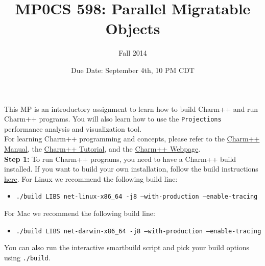 \documentclass{article}
\title{MP0}
\title{CS 598: Parallel Migratable Objects}
\author{Fall 2014}
\date{Due Date: September 4th, 10 PM CDT}
\begin{document}
\maketitle

This MP is an introductory assignment to learn how to build Charm++ and run
Charm++ programs. You will also learn how to use the \texttt{Projections}
performance analysis and visualization tool. \\

For learning Charm++ programming and concepts, please refer to the
\href{http://charm.cs.illinois.edu/manuals/html/charm++/}{Charm++ Manual},
the \href{http://charm.cs.illinois.edu/tutorial/}{Charm++ Tutorial},
and the \href{http://charmplusplus.org/}{Charm++ Webpage}.\\

\textbf{Step 1:} To run Charm++ programs, you need to have a Charm++ build
installed. If you want to build your own installation, follow the build
instructions \href{http://charm.cs.illinois.edu/manuals/html/charm++/A.html}{here}.
For Linux we recommend the following build line:
\begin{itemize}
\item \texttt{./build LIBS net-linux-x86\_64 -j8 --with-production --enable-tracing}
\end{itemize}
For Mac we recommend the following build line:
\begin{itemize}
\item \texttt{./build LIBS net-darwin-x86\_64 -j8 --with-production --enable-tracing}
\end{itemize}
You can also run the interactive smartbuild script and pick your build options using \texttt{./build}.\\
\end{document}
